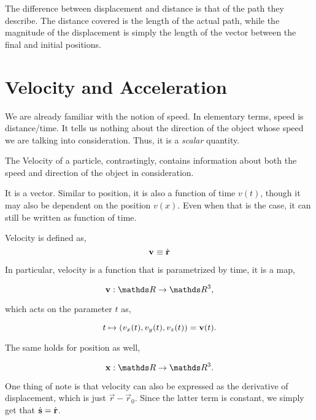 The difference between displacement and distance is that of the path they describe. The distance covered is the length
of the actual path, while the magnitude of the displacement is simply the length of the vector between the final and initial positions.

\section{Velocity and Acceleration}


We are already familiar with the notion of speed. In elementary terms, speed is {distance}/{time}.
It tells us nothing about the direction of the object whose speed we are
talking into consideration. Thus, it is a \emph{scalar} quantity.


The Velocity of a particle, contrastingly, contains information about both the speed and direction of the
object in consideration. 

It is a vector. Similar to position, it is also a function of time \(v(t)\), though it
may also be dependent on the position \(v(x)\). Even when that is the case,
it can still be written as function of time.

\begin{definition}
    [Velocity]
    \label{def: velocity}
    Velocity is defined as,
    \begin{equation}
        \boldsymbol{\mathbf{v}} \equiv \dot{\boldsymbol{\mathbf{r}}}    
    \end{equation}
\end{definition}


In particular, velocity is a function that is parametrized by time, 
it is a map,

\[
    \vv : \RR \to \RR^3,
\] 

which acts on the parameter \(t\) as, 

\begin{equation*}
    t \mapsto (v_x(t), v_y(t), v_z(t)) = \boldsymbol{\mathbf{v}}(t).
\end{equation*}

The same holds for position as well,

\[
    \vec{x} : \RR \to \RR^3.
\]

One thing of note is that velocity can also be expressed as the derivative of 
displacement, which is just \(\vec{r} - \vec{r}_0\). Since the latter 
term is constant, we simply get that \(\dot{\boldsymbol{\mathbf{s}}} = \dot{\boldsymbol{\mathbf{r}}}\).

